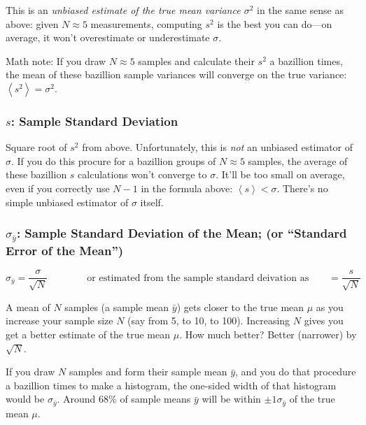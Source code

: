 \documentclass[12pt]{article}
\begin{document}
This is an \textit{unbiased estimate of the true mean variance $\sigma^2$} in the same sense as above: given $N\approx5$ measurements, computing $s^2$ is the best you can do---on average, it won't overestimate or underestimate $\sigma$. 

Math note: If you draw $N\approx5$ samples and calculate their $s^2$ a bazillion times, the mean of these bazillion sample variances will converge on the true variance: $\left< s^2 \right> = \sigma^2$.



\subsubsection*{$s$: Sample Standard Deviation} 

Square root of $s^2$ from above. Unfortunately, this is \textit{not} an unbiased estimator of $\sigma$. If you do this procure for a bazillion groups of $N\approx5$ samples, the average of these bazillion $s$ calculations won't converge to $\sigma$. It'll be too small on average, even if you correctly use $N-1$ in the formula above: $\left< s \right> < \sigma$. There's no simple unbiased estimator of $\sigma$ itself.

\subsubsection*{$\sigma_{\bar y}$: Sample Standard Deviation of the Mean; (or ``Standard Error of the Mean'')} 

\[
\sigma_{\bar y} = \frac{\sigma}{\sqrt{N}}
\qquad \qquad
\textrm{or estimated from the sample standard deivation as}
\qquad
= \frac{s}{\sqrt{N}}
\]


A mean of $N$ samples (a sample mean $\bar y$) gets closer to the true mean $\mu$ as you increase your sample size $N$ (say from 5, to 10, to 100). Increasing $N$ gives you get a better estimate of the true mean $\mu$. How much better? Better (narrower) by $\sqrt{N}$.

If you draw $N$ samples and form their sample mean $\bar y$, and you do that procedure a bazillion times to make a histogram, the one-sided width of that histogram would be $\sigma_{\bar y}$. Around 68\% of sample means $\bar y$ will be within $\pm1\sigma_{\bar y}$ of the true mean $\mu$.
\end{document}
